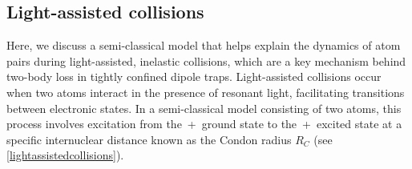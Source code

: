 \documentclass[../Thesis-IJspeert.tex]{subfiles}
\begin{document}
\subsection{Light-assisted collisions}
Here, we discuss a semi-classical model that helps explain the dynamics of atom pairs during light-assisted, inelastic collisions, which are a key mechanism behind two-body loss in tightly confined dipole traps. Light-assisted collisions occur when two atoms interact in the presence of resonant light, facilitating transitions between electronic states. In a semi-classical model consisting of two  atoms, this process involves excitation from the \,+\, ground state to the \,+\, excited state at a specific internuclear distance known as the Condon radius $R_C$ (see \autoref{lightassistedcollisions}).
\end{document}
